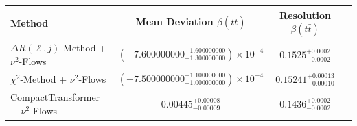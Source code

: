     \begin{tabular}{lccc}
        \toprule
        Method & Mean Deviation $\beta(t\bar{t})$ & Resolution $\beta(t\bar{t})$ \\
        \midrule
        $\Delta R(\ell,j)$-Method + $\nu^2$-Flows & $(-7.600000000^{+1.600000000}_{-1.300000000})\times 10^{-4}$ & $0.1525^{+0.0002}_{-0.0002}$ \\
        $\chi^2$-Method + $\nu^2$-Flows & $(-7.500000000^{+1.100000000}_{-1.000000000})\times 10^{-4}$ & $0.15241^{+0.00013}_{-0.00010}$ \\
        CompactTransformer + $\nu^2$-Flows & $0.00445^{+0.00008}_{-0.00009}$ & $0.1436^{+0.0002}_{-0.0002}$ \\
        \bottomrule
    \end{tabular}